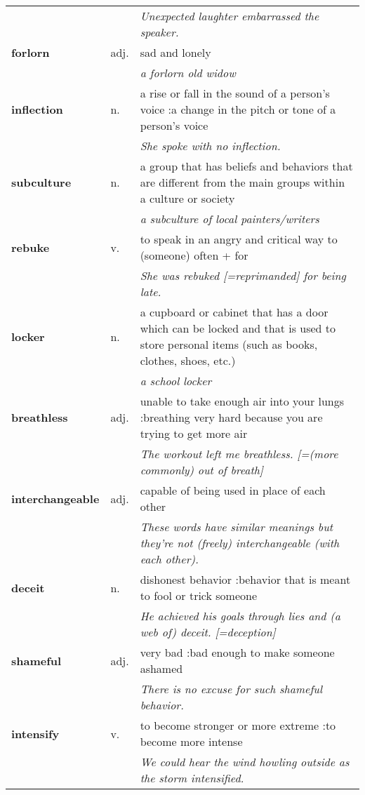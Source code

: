 \documentclass[a4paper]{article}
\begin{document}
\begin{longtable}{llp{11cm}}
 & & \textit{Unexpected laughter embarrassed the speaker.}\\[0.08cm]
\textbf{forlorn} & adj. &  sad and lonely \\
 & & \textit{a forlorn old widow}\\[0.08cm]
\textbf{inflection} & n. &  a rise or fall in the sound of a person's voice :a change in the pitch or tone of a person's voice \\
 & & \textit{She spoke with no inflection.}\\[0.08cm]
\textbf{subculture} & n. &  a group that has beliefs and behaviors that are different from the main groups within a culture or society \\
 & & \textit{a subculture of local painters/writers}\\[0.08cm]
\textbf{rebuke} & v. &  to speak in an angry and critical way to (someone) often + for \\
 & & \textit{She was rebuked [=reprimanded] for being late.}\\[0.08cm]
\textbf{locker} & n. &  a cupboard or cabinet that has a door which can be locked and that is used to store personal items (such as books, clothes, shoes, etc.) \\
 & & \textit{a school locker}\\[0.08cm]
\textbf{breathless} & adj. &  unable to take enough air into your lungs :breathing very hard because you are trying to get more air \\
 & & \textit{The workout left me breathless. [=(more commonly) out of breath]}\\[0.08cm]
\textbf{interchangeable} & adj. &  capable of being used in place of each other \\
 & & \textit{These words have similar meanings but they're not (freely) interchangeable (with each other).}\\[0.08cm]
\textbf{deceit} & n. &  dishonest behavior :behavior that is meant to fool or trick someone \\
 & & \textit{He achieved his goals through lies and (a web of) deceit. [=deception]}\\[0.08cm]
\textbf{shameful} & adj. &  very bad :bad enough to make someone ashamed \\
 & & \textit{There is no excuse for such shameful behavior.}\\[0.08cm]
\textbf{intensify} & v. &  to become stronger or more extreme :to become more intense \\
 & & \textit{We could hear the wind howling outside as the storm intensified.}\\[0.08cm]

\end{longtable}
\end{document}
